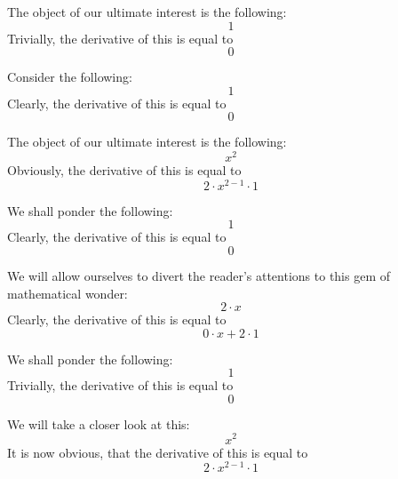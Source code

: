 \documentclass{article}
\begin{document}
The object of our ultimate interest is the following:
\begin{equation}
1 
\end{equation}
Trivially, the derivative of this is equal to
\begin{equation}
0 
\end{equation}

Consider the following:
\begin{equation}
1 
\end{equation}
Clearly, the derivative of this is equal to
\begin{equation}
0 
\end{equation}

The object of our ultimate interest is the following:
\begin{equation}
x ^{2 } 
\end{equation}
Obviously, the derivative of this is equal to
\begin{equation}
2 \cdot x ^{2 - 1 } \cdot 1 
\end{equation}

We shall ponder the following:
\begin{equation}
1 
\end{equation}
Clearly, the derivative of this is equal to
\begin{equation}
0 
\end{equation}

We will allow ourselves to divert the reader's attentions to this gem of mathematical wonder:
\begin{equation}
2 \cdot x 
\end{equation}
Clearly, the derivative of this is equal to
\begin{equation}
0 \cdot x + 2 \cdot 1 
\end{equation}

We shall ponder the following:
\begin{equation}
1 
\end{equation}
Trivially, the derivative of this is equal to
\begin{equation}
0 
\end{equation}

We will take a closer look at this:
\begin{equation}
x ^{2 } 
\end{equation}
It is now obvious, that the derivative of this is equal to
\begin{equation}
2 \cdot x ^{2 - 1 } \cdot 1 
\end{equation}
\end{document}
